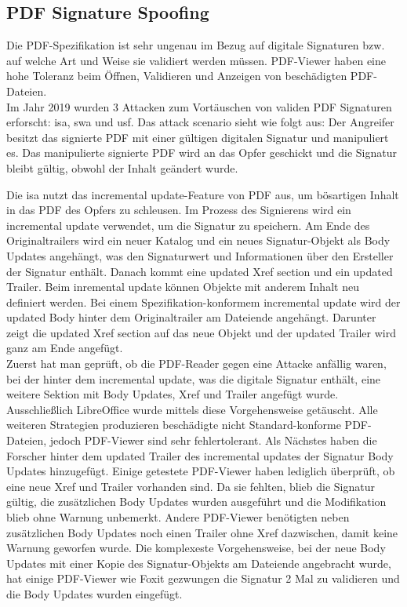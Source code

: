 \subsection{PDF Signature Spoofing}
Die PDF-Spezifikation ist sehr ungenau im Bezug auf digitale Signaturen bzw. auf welche Art und Weise sie validiert werden müssen. PDF-Viewer haben eine hohe Toleranz beim Öffnen, Validieren und Anzeigen von beschädigten PDF-Dateien. \\
Im Jahr 2019 wurden 3 Attacken zum Vortäuschen von validen PDF Signaturen erforscht: \gls{isa}, \gls{swa} und \gls{usf}. Das attack scenario sieht wie folgt aus: Der Angreifer besitzt das signierte PDF mit einer gültigen digitalen Signatur und manipuliert es. Das manipulierte signierte PDF wird an das Opfer geschickt und die Signatur bleibt gültig, obwohl der Inhalt geändert wurde. \cite{ccc-break-pdf}
\par
Die \gls{isa} nutzt das incremental update-Feature von PDF aus, um bösartigen Inhalt in das PDF des Opfers zu schleusen. Im Prozess des Signierens wird ein incremental update verwendet, um die Signatur zu speichern. Am Ende des Originaltrailers wird ein neuer Katalog und ein neues Signatur-Objekt als Body Updates angehängt, was den Signaturwert und Informationen über den Ersteller der Signatur enthält. Danach kommt eine updated Xref section und ein updated Trailer. Beim inremental update können Objekte mit anderem Inhalt neu definiert werden. Bei einem Spezifikation-konformem incremental update wird der updated Body hinter dem Originaltrailer am Dateiende angehängt. Darunter zeigt die updated Xref section auf das neue Objekt und der updated Trailer wird ganz am Ende angefügt. \\
Zuerst hat man geprüft, ob die PDF-Reader gegen eine Attacke anfällig waren, bei der hinter dem incremental update, was die digitale Signatur enthält, eine weitere Sektion mit Body Updates, Xref und Trailer angefügt wurde. Ausschließlich LibreOffice wurde mittels diese Vorgehensweise getäuscht. Alle weiteren Strategien produzieren beschädigte nicht Standard-konforme PDF-Dateien, jedoch PDF-Viewer sind sehr fehlertolerant. Als Nächstes haben die Forscher hinter dem updated Trailer des incremental updates der Signatur Body Updates hinzugefügt. Einige getestete PDF-Viewer haben lediglich überprüft, ob eine neue Xref und Trailer vorhanden sind. Da sie fehlten, blieb die Signatur gültig, die zusätzlichen Body Updates wurden ausgeführt und die Modifikation blieb ohne Warnung unbemerkt. Andere PDF-Viewer benötigten neben zusätzlichen Body Updates noch einen Trailer ohne Xref dazwischen, damit keine Warnung geworfen wurde. Die komplexeste Vorgehensweise, bei der neue Body Updates mit einer Kopie des Signatur-Objekts am Dateiende angebracht wurde, hat einige PDF-Viewer wie Foxit gezwungen die Signatur 2 Mal zu validieren und die Body Updates wurden eingefügt. \cite{ccc-break-pdf}

